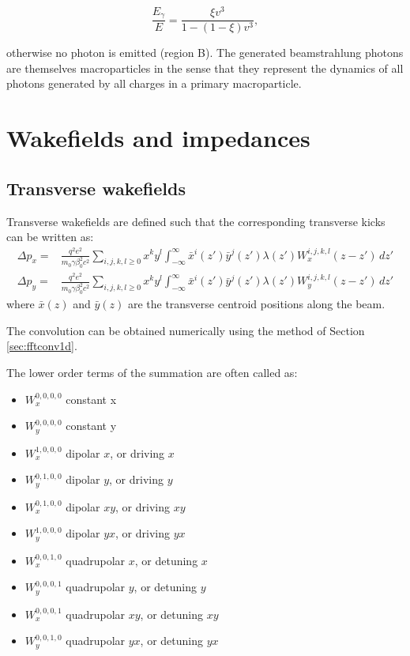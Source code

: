 \begin{equation}
\frac{E_\gamma}{E} = \frac{\xi v^3}{1 - (1 - \xi)v^3},
	\label{eq:bs_14}
\end{equation}

otherwise no photon is emitted (region B). The generated beamstrahlung photons are themselves macroparticles in the sense that they represent the dynamics of all photons generated by all charges in a primary macroparticle.
\newpage


\chapter{Wakefields and impedances}

\section{Transverse wakefields}

Transverse wakefields are defined such that the corresponding transverse kicks can be written as:
\begin{align}
    \Delta p_x = 
     & \frac{q^2 e^2}{m_0 \gamma \beta_0^2 c^2}
     \sum_{i,j,k,l \geq 0} 
        x^k y^l\int_{-\infty}^\infty
        \bar{x}^i(z')\bar{y}^j(z')\lambda(z')W^{i,j,k,l}_{x}(z - z') \, dz'
        \label{eq:wake_kick_x}\\
    \Delta p_y =
     & \frac{q^2 e^2}{m_0 \gamma \beta_0^2 c^2}
     \sum_{i,j,k,l \geq 0} 
        x^k y^l\int_{-\infty}^\infty
        \bar{x}^i(z')\bar{y}^j(z')\lambda(z')W^{i,j, k, l}_{y}(z - z') \, dz'
        \label{eq:wake_kick_y}
\end{align}
where $\bar{x}(z)$ and $\bar{y}(z)$ are the transverse centroid positions along the beam.

The convolution can be obtained numerically using the method of Section \ref{sec:fftconv1d}.



The lower order terms of the summation are often called as:
\begin{itemize}
    \item $W_x^{0,0,0,0}$ constant x
    \item $W_y^{0,0,0,0}$ constant y
    \item $W_x^{1,0,0,0}$ dipolar $x$, or driving $x$
    \item $W_y^{0,1,0,0}$ dipolar $y$, or driving $y$ 
    \item $W_x^{0,1,0,0}$ dipolar $xy$, or driving $xy$
    \item $W_y^{1,0,0,0}$ dipolar $yx$, or driving $yx$
    \item $W_x^{0,0,1,0}$ quadrupolar $x$, or detuning $x$
    \item $W_y^{0,0,0,1}$ quadrupolar $y$, or detuning $y$
    \item $W_x^{0,0,0,1}$ quadrupolar $xy$, or detuning $xy$
    \item $W_y^{0,0,1,0}$ quadrupolar $yx$, or detuning $yx$
\end{itemize}

